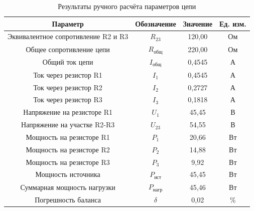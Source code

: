 \begin{table}[H]
    \centering
    \caption{Результаты ручного расчёта параметров цепи}
    \begin{tabular}{|c|c|c|c|}
        \hline
        \textbf{Параметр} & \textbf{Обозначение} & \textbf{Значение} & \textbf{Ед. изм.} \\
        \hline
        Эквивалентное сопротивление R2 и R3 & \(R_{23}\) & 120,00 & Ом \\
        Общее сопротивление цепи & \(R_{\text{общ}}\) & 220,00 & Ом \\
        Общий ток цепи & \(I_{\text{общ}}\) & 0,4545 & А \\
        Ток через резистор R1 & \(I_1\) & 0,4545 & А \\
        Ток через резистор R2 & \(I_2\) & 0,2727 & А \\
        Ток через резистор R3 & \(I_3\) & 0,1818 & А \\
        Напряжение на резисторе R1 & \(U_1\) & 45,45 & В \\
        Напряжение на участке R2-R3 & \(U_{23}\) & 54,55 & В \\
        Мощность на резисторе R1 & \(P_1\) & 20,66 & Вт \\
        Мощность на резисторе R2 & \(P_2\) & 14,88 & Вт \\
        Мощность на резисторе R3 & \(P_3\) & 9,92 & Вт \\
        Мощность источника & \(P_{\text{ист}}\) & 45,45 & Вт \\
        Суммарная мощность нагрузки & \(P_{\text{нагр}}\) & 45,46 & Вт \\
        Погрешность баланса & \(\delta\) & 0,02 & \% \\
        \hline
    \end{tabular}
    \label{tab:manual}
\end{table}
